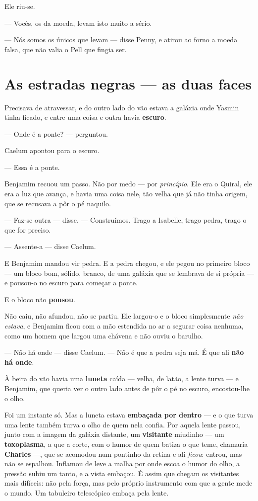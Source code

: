 \documentclass[livro.tex]{subfiles}
\begin{document}
Ele riu-se.

--- Vocês, os da moeda, levam isto muito a sério.

--- Nós somos os únicos que levam --- disse Penny, e atirou ao forno a moeda falsa, que não valia o
Pell que fingia ser.


\chapter{As estradas negras --- as duas faces}

Precisava de atravessar, e do outro lado do vão estava a galáxia onde Yasmin tinha ficado, e entre uma coisa e
outra havia \textbf{escuro}.

--- Onde é a ponte? --- perguntou.

Caelum apontou para o escuro.

--- Essa é a ponte.

\medskip

Benjamim recuou um passo. Não por medo --- por \emph{princípio}. Ele era o Quiral, ele era a luz que avança, e havia
uma coisa nele, tão velha que já não tinha origem, que se recusava a pôr o pé naquilo.

--- Faz-se outra --- disse. --- Construímos. Trago a Isabelle, trago pedra, trago o que for preciso.

--- Assente-a --- disse Caelum.

E Benjamim mandou vir pedra. E a pedra chegou, e ele pegou no primeiro bloco --- um bloco bom, sólido, branco, de
uma galáxia que se lembrava de si própria --- e pousou-o no escuro para começar a ponte.

E o bloco não \textbf{pousou}.

Não caiu, não afundou, não se partiu. Ele largou-o e o bloco simplesmente \emph{não estava}, e Benjamim ficou com a
mão estendida no ar a segurar coisa nenhuma, como um homem que largou uma chávena e não ouviu o barulho.

--- Não há onde --- disse Caelum. --- Não é que a pedra seja má. É que ali \textbf{não há onde}.

\medskip

À beira do vão havia uma \textbf{luneta} caída --- velha, de latão, a lente turva --- e Benjamim, que queria ver o
outro lado antes de pôr o pé no escuro, encostou-lhe o olho.

Foi um instante só. Mas a luneta estava \textbf{embaçada por dentro} --- e o que turva uma lente também turva o
olho de quem nela confia. Por aquela lente passou, junto com a imagem da galáxia distante, um \textbf{visitante}
miudinho --- um \textbf{toxoplasma}, a que a corte, com o humor de quem batiza o que teme, chamaria
\textbf{Charles} ---, que se acomodou num pontinho da retina e ali \emph{ficou}: entrou, mas
não se espalhou. Inflamou de leve a malha por onde escoa o humor do olho, a pressão subiu um tanto, e a vista
embaçou. É assim que chegam os visitantes mais difíceis: não pela força, mas pelo próprio instrumento com que a
gente mede o mundo. Um tabuleiro telescópico embaça pela lente.
\end{document}
